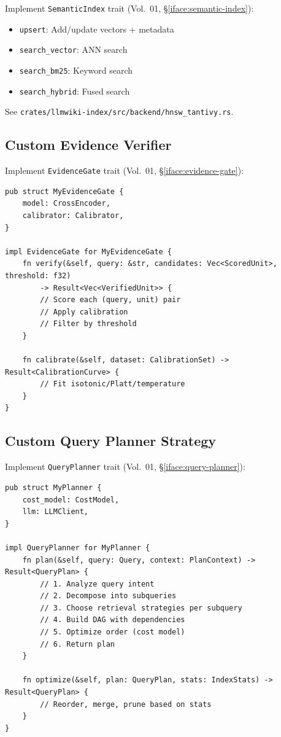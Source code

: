Implement \texttt{SemanticIndex} trait (Vol.~01, \S\ref{iface:semantic-index}):
\begin{itemize}
  \item \texttt{upsert}: Add/update vectors + metadata
  \item \texttt{search\_vector}: ANN search
  \item \texttt{search\_bm25}: Keyword search
  \item \texttt{search\_hybrid}: Fused search
\end{itemize}

See \texttt{crates/llmwiki-index/src/backend/hnsw\_tantivy.rs}.

\subsection{Custom Evidence Verifier}
\label{sec:dev:evidence-verifier}

Implement \texttt{EvidenceGate} trait (Vol.~01, \S\ref{iface:evidence-gate}):
\begin{verbatim}
pub struct MyEvidenceGate {
    model: CrossEncoder,
    calibrator: Calibrator,
}

impl EvidenceGate for MyEvidenceGate {
    fn verify(&self, query: &str, candidates: Vec<ScoredUnit>, threshold: f32) 
        -> Result<Vec<VerifiedUnit>> {
        // Score each (query, unit) pair
        // Apply calibration
        // Filter by threshold
    }

    fn calibrate(&self, dataset: CalibrationSet) -> Result<CalibrationCurve> {
        // Fit isotonic/Platt/temperature
    }
}
\end{verbatim}

\subsection{Custom Query Planner Strategy}
\label{sec:dev:planner}

Implement \texttt{QueryPlanner} trait (Vol.~01, \S\ref{iface:query-planner}):
\begin{verbatim}
pub struct MyPlanner {
    cost_model: CostModel,
    llm: LLMClient,
}

impl QueryPlanner for MyPlanner {
    fn plan(&self, query: Query, context: PlanContext) -> Result<QueryPlan> {
        // 1. Analyze query intent
        // 2. Decompose into subqueries
        // 3. Choose retrieval strategies per subquery
        // 4. Build DAG with dependencies
        // 5. Optimize order (cost model)
        // 6. Return plan
    }

    fn optimize(&self, plan: QueryPlan, stats: IndexStats) -> Result<QueryPlan> {
        // Reorder, merge, prune based on stats
    }
}
\end{verbatim}

